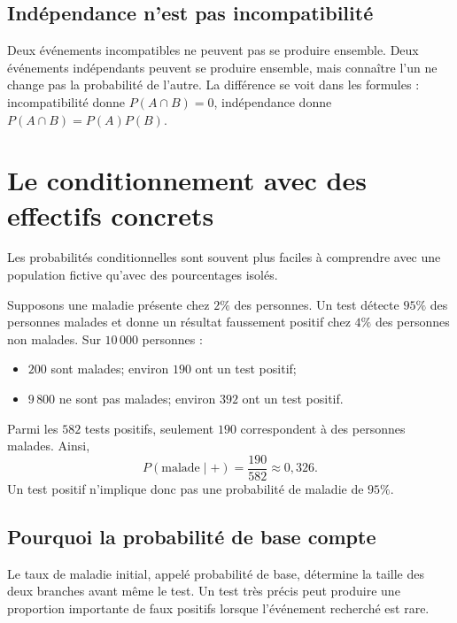 \documentclass[12pt,a4paper,openany]{book}
\begin{document}
\subsection{Indépendance n'est pas incompatibilité}
Deux événements incompatibles ne peuvent pas se produire ensemble. Deux événements indépendants peuvent se produire ensemble, mais connaître l'un ne change pas la probabilité de l'autre. La différence se voit dans les formules : incompatibilité donne $P(A\cap B)=0$, indépendance donne $P(A\cap B)=P(A)P(B)$.


\section{Le conditionnement avec des effectifs concrets}

Les probabilités conditionnelles sont souvent plus faciles à comprendre avec une population fictive qu'avec des pourcentages isolés.

Supposons une maladie présente chez $2\%$ des personnes. Un test détecte $95\%$ des personnes malades et donne un résultat faussement positif chez $4\%$ des personnes non malades. Sur $10\,000$ personnes :
\begin{itemize}
\item $200$ sont malades; environ $190$ ont un test positif;
\item $9\,800$ ne sont pas malades; environ $392$ ont un test positif.
\end{itemize}
Parmi les $582$ tests positifs, seulement $190$ correspondent à des personnes malades. Ainsi,
\[
P(\text{malade}\mid +)=\frac{190}{582}\approx0{,}326.
\]
Un test positif n'implique donc pas une probabilité de maladie de $95\%$.

\begin{center}
\end{center}

\subsection{Pourquoi la probabilité de base compte}
Le taux de maladie initial, appelé probabilité de base, détermine la taille des deux branches avant même le test. Un test très précis peut produire une proportion importante de faux positifs lorsque l'événement recherché est rare.
\end{document}
